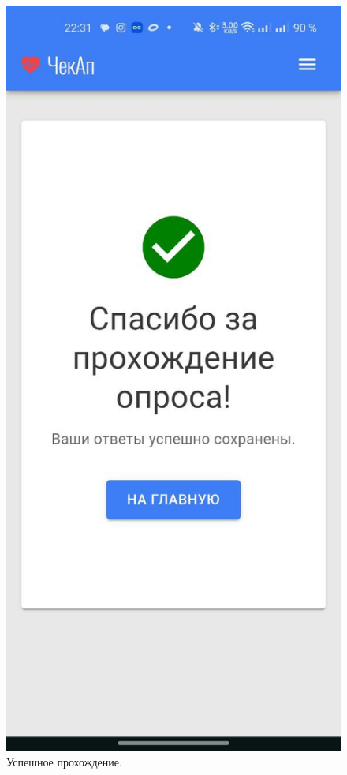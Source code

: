 \begin{figure}[htbp]
    \centering
    \includegraphics[height=\dimexpr\textheight/3\relax]{images/screenshots/inquierer_success}
    \caption{Успешное прохождение.}
    \label{fig:figure57}
\end{figure}

